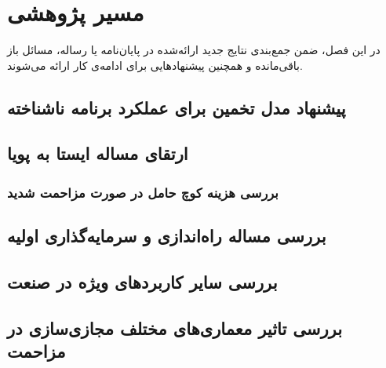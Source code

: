 
\chapter{مسیر پژوهشی}

در این فصل، ضمن جمع‌بندی نتایج جدید ارائه‌شده در پایان‌نامه یا رساله، 
مسائل باز باقی‌مانده و همچنین پیشنهادهایی برای ادامه‌ی کار ارائه می‌شوند.

\section{پیشنهاد مدل تخمین برای عملکرد برنامه ناشناخته}
\section{ارتقای مساله ایستا به پویا}
\subsection{بررسی هزینه کوچ حامل در صورت مزاحمت شدید}
\section{بررسی مساله راه‌اندازی و سرمایه‌گذاری اولیه}
\section{بررسی سایر کاربردهای ویژه در صنعت}
\section{بررسی تاثیر معماری‌های مختلف مجازی‌سازی در مزاحمت}